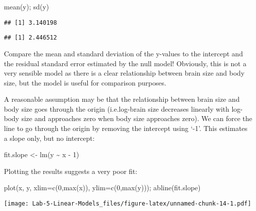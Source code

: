 \documentclass[
]{article}
\newenvironment{Shaded}{\begin{snugshade}}{\end{snugshade}}
\newcommand{\AttributeTok}[1]{\textcolor[rgb]{0.77,0.63,0.00}{#1}}
\newcommand{\DecValTok}[1]{\textcolor[rgb]{0.00,0.00,0.81}{#1}}
\newcommand{\FunctionTok}[1]{\textcolor[rgb]{0.00,0.00,0.00}{#1}}
\newcommand{\NormalTok}[1]{#1}
\newcommand{\OtherTok}[1]{\textcolor[rgb]{0.56,0.35,0.01}{#1}}
\newcommand{\SpecialCharTok}[1]{\textcolor[rgb]{0.00,0.00,0.00}{#1}}
\begin{document}
\begin{Shaded}
\begin{Highlighting}[]
\FunctionTok{mean}\NormalTok{(y); }\FunctionTok{sd}\NormalTok{(y)  }
\end{Highlighting}
\end{Shaded}

\begin{verbatim}
## [1] 3.140198
\end{verbatim}

\begin{verbatim}
## [1] 2.446512
\end{verbatim}

Compare the mean and standard deviation of the y-values to the intercept
and the residual standard error estimated by the null model! Obviously,
this is not a very sensible model as there is a clear relationship
between brain size and body size, but the model is useful for comparison
purposes.

A reasonable assumption may be that the relationship between brain size
and body size goes through the origin (i.e.log-brain size decreases
linearly with log-body size and approaches zero when body size
approaches zero). We can force the line to go through the origin by
removing the intercept using `-1'. This estimates a slope only, but no
intercept:

\begin{Shaded}
\begin{Highlighting}[]
\NormalTok{fit.slope }\OtherTok{\textless{}{-}} \FunctionTok{lm}\NormalTok{(y }\SpecialCharTok{\textasciitilde{}}\NormalTok{ x }\SpecialCharTok{{-}} \DecValTok{1}\NormalTok{)}
\end{Highlighting}
\end{Shaded}

Plotting the results suggests a very poor fit:

\begin{Shaded}
\begin{Highlighting}[]
\FunctionTok{plot}\NormalTok{(x, y, }\AttributeTok{xlim=}\FunctionTok{c}\NormalTok{(}\DecValTok{0}\NormalTok{,}\FunctionTok{max}\NormalTok{(x)), }\AttributeTok{ylim=}\FunctionTok{c}\NormalTok{(}\DecValTok{0}\NormalTok{,}\FunctionTok{max}\NormalTok{(y))); }\FunctionTok{abline}\NormalTok{(fit.slope)}
\end{Highlighting}
\end{Shaded}

\texttt{[image: Lab-5-Linear-Models\_files/figure-latex/unnamed-chunk-14-1.pdf]}
\end{document}
